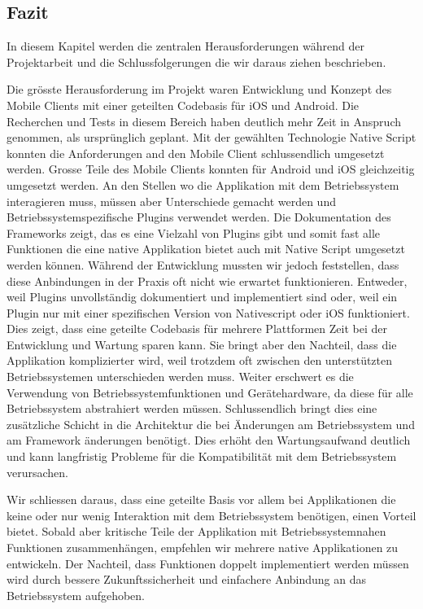 \subsection{Fazit}

In diesem Kapitel werden die zentralen Herausforderungen während der Projektarbeit und die Schlussfolgerungen die wir daraus ziehen beschrieben.

Die grösste Herausforderung im Projekt waren Entwicklung und Konzept des Mobile Clients mit einer geteilten Codebasis für iOS und Android.
Die Recherchen und Tests in diesem Bereich haben deutlich mehr Zeit in Anspruch genommen, als ursprünglich geplant.
Mit der gewählten Technologie Native Script konnten die Anforderungen and den Mobile Client schlussendlich umgesetzt werden.
Grosse Teile des Mobile Clients konnten für Android und iOS gleichzeitig umgesetzt werden.
An den Stellen wo die Applikation mit dem Betriebssystem interagieren muss, müssen aber Unterschiede gemacht werden und Betriebssystemspezifische Plugins verwendet werden.
Die Dokumentation des Frameworks zeigt, das es eine Vielzahl von Plugins gibt und somit fast alle Funktionen die eine native Applikation bietet auch mit Native Script umgesetzt werden können.
Während der Entwicklung mussten wir jedoch feststellen, dass diese Anbindungen in der Praxis oft nicht wie erwartet funktionieren.
Entweder, weil Plugins unvollständig dokumentiert und implementiert sind oder, weil ein Plugin nur mit einer spezifischen Version von Nativescript oder iOS funktioniert.
Dies zeigt, dass eine geteilte Codebasis für mehrere Plattformen Zeit bei der Entwicklung und Wartung sparen kann.
Sie bringt aber den Nachteil, dass die Applikation komplizierter wird, weil trotzdem oft zwischen den unterstützten Betriebssystemen unterschieden werden muss.
Weiter erschwert es die Verwendung von Betriebssystemfunktionen und Gerätehardware, da diese für alle Betriebssystem abstrahiert werden müssen.
Schlussendlich bringt dies eine zusätzliche Schicht in die Architektur die bei Änderungen am Betriebssystem und am Framework änderungen benötigt.
Dies erhöht den Wartungsaufwand deutlich und kann langfristig Probleme für die Kompatibilität mit dem Betriebssystem verursachen.

Wir schliessen daraus, dass eine geteilte Basis vor allem bei Applikationen die keine oder nur wenig Interaktion mit dem Betriebssystem benötigen, einen Vorteil bietet.
Sobald aber kritische Teile der Applikation mit Betriebssystemnahen Funktionen zusammenhängen, empfehlen wir mehrere native Applikationen zu entwickeln.
Der Nachteil, dass Funktionen doppelt implementiert werden müssen wird durch bessere Zukunftssicherheit und einfachere Anbindung an das Betriebssystem aufgehoben.

